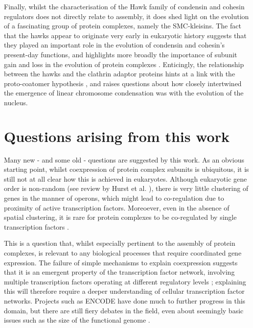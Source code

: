 \documentclass[a4paper,11pt,twoside,openright]{scrbook}
\begin{document}
Finally, whilst the characterisation of the Hawk family of condensin and cohesin regulators does not directly relate to assembly, it does shed light on the evolution of a fascinating group of protein complexes, namely the SMC-kleisins. The fact that the hawks appear to originate very early in eukaryotic history suggests that they played an important role in the evolution of condensin and cohesin's present-day functions, and highlights more broadly the importance of subunit gain and loss in the evolution of protein complexes \cite{Seidl2009,Wan2015}. Enticingly, the relationship between the hawks and the clathrin adaptor proteins hints at a link with the proto-coatomer hypothesis \cite{Devos2006,Field2011}, and raises questions about how closely intertwined the emergence of linear chromosome condensation was with the evolution of the nucleus.

\section{Questions arising from this work}
Many new - and some old - questions are suggested by this work. As an obvious starting point, whilst coexpression of protein complex subunits is ubiquitous, it is still not at all clear how this is achieved in eukaryotes. Although eukaryotic gene order is non-random (see review by Hurst et al. \cite{Hurst2004}), there is very little clustering of genes in the manner of operons, which might lead to co-regulation due to proximity of active transcription factors. Moreoever, even in the absence of spatial clustering, it is rare for protein complexes to be co-regulated by single transcription factors \cite{Tan2007}.

This is a question that, whilst especially pertinent to the assembly of protein complexes, is relevant to any biological processes that require coordinated gene expression. The failure of simple mechanisms to explain coexpression suggests that it is an emergent property of the transcription factor network, involving multiple transcription factors operating at different regulatory levels \cite{Tsai2007,Muhammad2017}; explaining this will therefore require a deeper understanding of cellular transcription factor networks. Projects such as ENCODE have done much to further progress in this domain, but there are still fiery debates in the field, even about seemingly basic issues such as the size of the functional genome \cite{Neph2012,Graur2013,Graur2017}.
\end{document}
